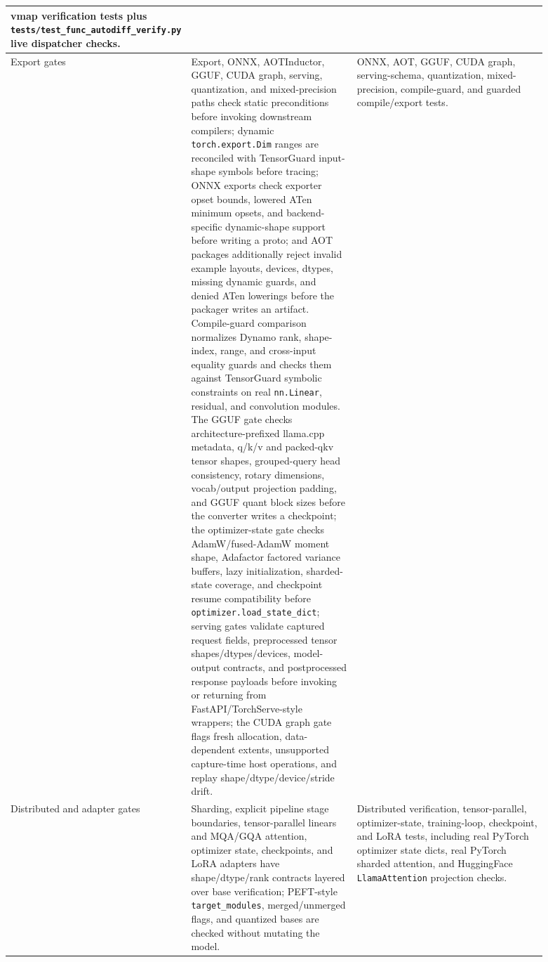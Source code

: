 \documentclass[11pt]{article}
\newcommand{\tg}{TensorGuard}
\begin{document}
\begin{longtable}{|p{0.22\linewidth}|p{0.31\linewidth}|p{0.36\linewidth}|}
vmap verification tests plus \texttt{tests/test\_func\_autodiff\_verify.py}
live dispatcher checks. \\
\hline
Export gates &
Export, ONNX, AOTInductor, GGUF, CUDA graph, serving, quantization, and mixed-precision paths check static
preconditions before invoking downstream compilers; dynamic
\texttt{torch.export.Dim} ranges are reconciled with TensorGuard input-shape
symbols before tracing; ONNX exports check exporter opset bounds, lowered ATen
minimum opsets, and backend-specific dynamic-shape support before writing a
proto; and AOT packages additionally reject invalid example layouts, devices,
dtypes, missing dynamic guards, and denied ATen lowerings before the packager
writes an artifact.  Compile-guard comparison normalizes Dynamo rank, shape-index,
range, and cross-input equality guards and checks them against \tg{} symbolic
constraints on real \texttt{nn.Linear}, residual, and convolution modules.  The GGUF gate checks architecture-prefixed llama.cpp
metadata, q/k/v and packed-qkv tensor shapes, grouped-query head consistency,
rotary dimensions, vocab/output projection padding, and GGUF quant block sizes
before the converter writes a checkpoint; the optimizer-state gate checks
AdamW/fused-AdamW moment shape, Adafactor factored variance buffers, lazy
initialization, sharded-state coverage, and checkpoint resume compatibility
before \texttt{optimizer.load\_state\_dict}; serving gates validate captured
request fields, preprocessed tensor shapes/dtypes/devices, model-output
contracts, and postprocessed response payloads before invoking or returning from
FastAPI/TorchServe-style wrappers; the CUDA graph gate flags fresh allocation,
data-dependent extents, unsupported capture-time host operations, and replay
shape/dtype/device/stride drift. &
ONNX, AOT, GGUF, CUDA graph, serving-schema, quantization, mixed-precision, compile-guard, and guarded compile/export
tests. \\
\hline
Distributed and adapter gates &
Sharding, explicit pipeline stage boundaries, tensor-parallel linears and
MQA/GQA attention, optimizer state, checkpoints, and LoRA adapters have
shape/dtype/rank contracts layered over base verification; PEFT-style
\texttt{target\_modules}, merged/unmerged flags, and quantized bases are checked
without mutating the model. &
Distributed verification, tensor-parallel, optimizer-state, training-loop,
checkpoint, and LoRA tests, including real PyTorch optimizer state dicts,
real PyTorch sharded attention, and HuggingFace
\texttt{LlamaAttention} projection checks. \\
\hline
\end{longtable}
\end{document}
